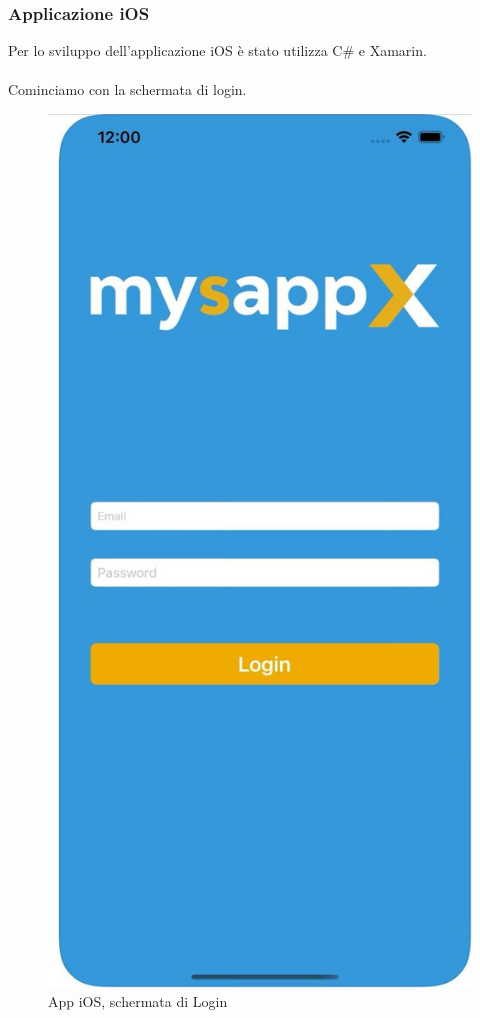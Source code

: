 \subsubsection{Applicazione iOS}
Per lo sviluppo dell'applicazione iOS è stato utilizza C\# e Xamarin.\\\\
Cominciamo con la schermata di login.\\
\begin{figure}[!h] 
	\centering 
	\includegraphics[scale = 0.2]{immagini/app iOS/login-iOS.jpeg} 
	\caption {App iOS, schermata di Login}
	\label{fig:2-14}
\end{figure}
